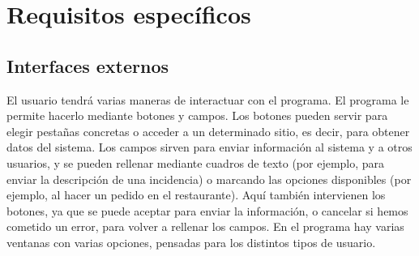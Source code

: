 \documentclass[spanish,a4paper,12pt]{report}		%
\begin{document}
\section{Requisitos específicos}



		\subsection{Interfaces externos}
			
			El usuario tendrá varias maneras de interactuar con el programa. El programa le permite hacerlo mediante botones y campos. Los botones pueden servir para elegir pestañas concretas o acceder a un determinado sitio, es decir, para obtener datos del sistema. Los campos sirven para enviar información al sistema y a otros usuarios, y se pueden rellenar mediante cuadros de texto (por ejemplo, para enviar la descripción de una incidencia) o marcando las opciones disponibles (por ejemplo, al hacer un pedido en el restaurante). Aquí también intervienen los botones, ya que se puede aceptar para enviar la información, o cancelar si hemos cometido un error, para volver a rellenar los campos. En el programa hay varias ventanas con varias opciones, pensadas para los distintos tipos de usuario.
\end{document}
